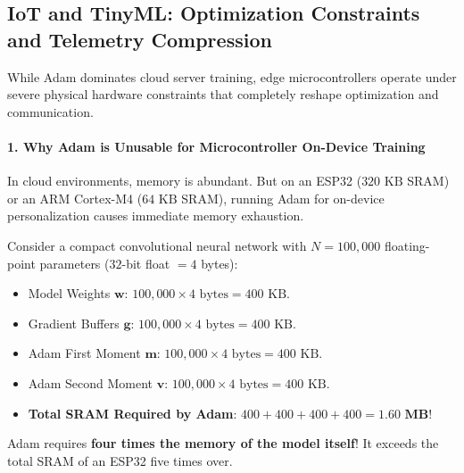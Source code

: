\subsection{IoT and TinyML: Optimization Constraints and Telemetry Compression}\label{subsec:opt_iot}

\begin{iotbox}
While Adam dominates cloud server training, edge microcontrollers operate under severe physical hardware constraints that completely reshape optimization and communication.

\paragraph{1. Why Adam is Unusable for Microcontroller On-Device Training}
In cloud environments, memory is abundant. But on an ESP32 ($320\text{ KB}$ SRAM) or an ARM Cortex-M4 ($64\text{ KB}$ SRAM), running Adam for on-device personalization causes immediate memory exhaustion.

Consider a compact convolutional neural network with $N = 100{,}000$ floating-point parameters ($32$-bit float $= 4$ bytes):
\begin{itemize}
    \item Model Weights $\mathbf{w}$: $100{,}000 \times 4\text{ bytes} = 400\text{ KB}$.
    \item Gradient Buffers $\mathbf{g}$: $100{,}000 \times 4\text{ bytes} = 400\text{ KB}$.
    \item Adam First Moment $\mathbf{m}$: $100{,}000 \times 4\text{ bytes} = 400\text{ KB}$.
    \item Adam Second Moment $\mathbf{v}$: $100{,}000 \times 4\text{ bytes} = 400\text{ KB}$.
    \item \textbf{Total SRAM Required by Adam}: $400 + 400 + 400 + 400 = \mathbf{1.60\text{ MB}}$!
\end{itemize}
Adam requires \textbf{four times the memory of the model itself}! It exceeds the total SRAM of an ESP32 five times over.


\end{iotbox}
